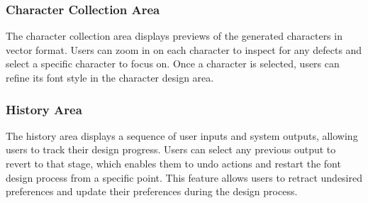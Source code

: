 \subsubsection{Character Collection Area}
\label{fig:characterCollectionComponent}
The character collection area displays previews of the generated characters in vector format.
Users can zoom in on each character to inspect for any defects and select a specific character to focus on.
Once a character is selected, users can refine its font style in the character design area.

\subsubsection{History Area}
\label{fig:historyComponent}
The history area displays a sequence of user inputs and system outputs, allowing users to track their design progress.
Users can select any previous output to revert to that stage, which enables them to undo actions and restart the font design process from a specific point.
This feature allows users to retract undesired preferences and update their preferences during the design process.
